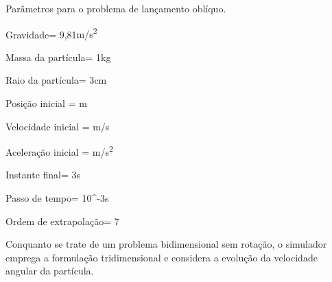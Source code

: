 \begin{table}[h]
\centering
\caption{Parâmetros para o problema de lançamento oblíquo.}
\label{tab:free_fall_case_parameters}
\begin{parametersdesc}{\textwidth}
	\item{Gravidade}{\gravityScalar = 9,81}{\si[per-mode=symbol]{\metre\per\square\second}}
	\hline
	\item{Massa da partícula}{\mass = 1}{\si\kilogram}
	\item{Raio da partícula}{\radius = 3}{\si\centi\metre}
	\item{Posição inicial}{\explicitVector{\initial{\positionx}}{\initial{\positiony}}{\initial{\positionz}} = }{\si{\metre}}
	\item{Velocidade inicial}{\explicitVector{\initial{\velocityx}}{\initial{\velocityy}}{\initial{\velocityz}} = }{\si[per-mode=symbol]{\metre\per\second}}
	\item{Aceleração inicial}{\explicitVector{\initial{\accelerationx}}{\initial{\accelerationy}}{\initial{\accelerationz}} = }{\si[per-mode=symbol]{\metre\per\square\second}}
	\hline
	\item{Instante final}{\finalInstant = 3}{\si\second} 
	\item{Passo de tempo}{\Dt = 10^{-3}}{\si\second}
	\item{Ordem de extrapolação}{\taylorOrder = 7}{\emptyUnit}
\end{parametersdesc}
\sourceMe 
\end{table}

Conquanto se trate de um problema bidimensional sem rotação, o simulador emprega a formulação tridimensional e considera a evolução da velocidade angular da partícula.

